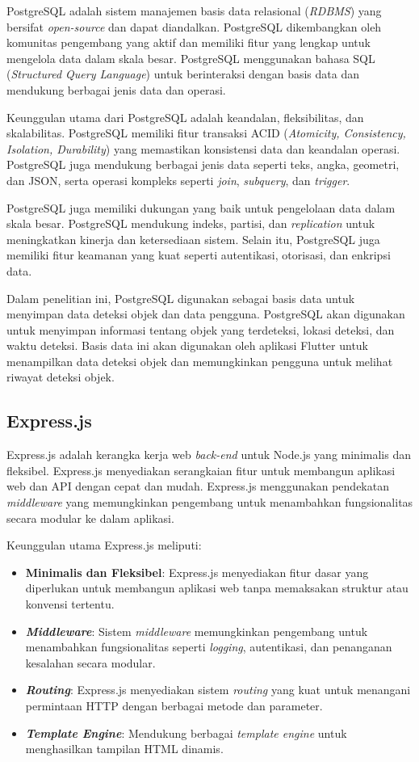 PostgreSQL adalah sistem manajemen basis data relasional (\emph{RDBMS}) yang bersifat \emph{open-source} dan dapat diandalkan. PostgreSQL dikembangkan oleh komunitas pengembang yang aktif dan memiliki fitur yang lengkap untuk mengelola data dalam skala besar. PostgreSQL menggunakan bahasa SQL (\emph{Structured Query Language}) untuk berinteraksi dengan basis data dan mendukung berbagai jenis data dan operasi. \parencite*{postgresql2025}

Keunggulan utama dari PostgreSQL adalah keandalan, fleksibilitas, dan skalabilitas. PostgreSQL memiliki fitur transaksi ACID (\emph{Atomicity, Consistency, Isolation, Durability}) yang memastikan konsistensi data dan keandalan operasi. PostgreSQL juga mendukung berbagai jenis data seperti teks, angka, geometri, dan JSON, serta operasi kompleks seperti \emph{join}, \emph{subquery}, dan \emph{trigger}.

PostgreSQL juga memiliki dukungan yang baik untuk pengelolaan data dalam skala besar. PostgreSQL mendukung indeks, partisi, dan \emph{replication} untuk meningkatkan kinerja dan ketersediaan sistem. Selain itu, PostgreSQL juga memiliki fitur keamanan yang kuat seperti autentikasi, otorisasi, dan enkripsi data.

Dalam penelitian ini, PostgreSQL digunakan sebagai basis data untuk menyimpan data deteksi objek dan data pengguna. PostgreSQL akan digunakan untuk menyimpan informasi tentang objek yang terdeteksi, lokasi deteksi, dan waktu deteksi. Basis data ini akan digunakan oleh aplikasi Flutter untuk menampilkan data deteksi objek dan memungkinkan pengguna untuk melihat riwayat deteksi objek.

\subsection{Express.js}

Express.js adalah kerangka kerja web \emph{back-end} untuk Node.js yang minimalis dan fleksibel. Express.js menyediakan serangkaian fitur untuk membangun aplikasi web dan API dengan cepat dan mudah. Express.js menggunakan pendekatan \emph{middleware} yang memungkinkan pengembang untuk menambahkan fungsionalitas secara modular ke dalam aplikasi. \parencite*{expressjs2024}

Keunggulan utama Express.js meliputi:
\begin{itemize}[nolistsep]
  \item \textbf{Minimalis dan Fleksibel}: Express.js menyediakan fitur dasar yang diperlukan untuk membangun aplikasi web tanpa memaksakan struktur atau konvensi tertentu.
  \item \textbf{\emph{Middleware}}: Sistem \emph{middleware} memungkinkan pengembang untuk menambahkan fungsionalitas seperti \emph{logging}, autentikasi, dan penanganan kesalahan secara modular.
  \item \textbf{\emph{Routing}}: Express.js menyediakan sistem \emph{routing} yang kuat untuk menangani permintaan HTTP dengan berbagai metode dan parameter.
  \item \textbf{\emph{Template Engine}}: Mendukung berbagai \emph{template engine} untuk menghasilkan tampilan HTML dinamis.
\end{itemize}

